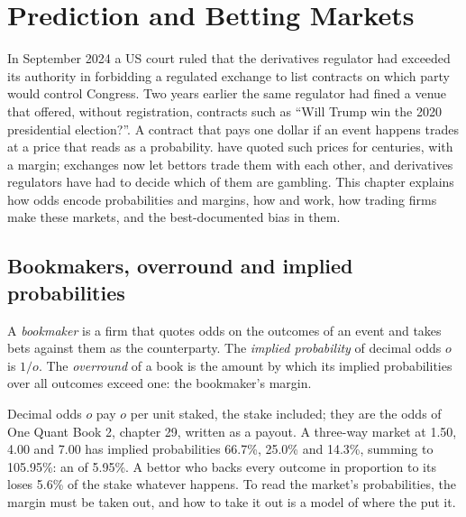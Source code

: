\chapter{Prediction and Betting Markets}\label{ch:m3:prediction-and-betting-markets}

In September 2024 a US court ruled that the derivatives regulator had exceeded its authority in
forbidding a regulated exchange to list contracts on which party would control Congress. Two years
earlier the same regulator had fined a  venue that offered, without registration, contracts
such as ``Will Trump win the 2020 presidential election?''. A contract that pays one dollar if an event happens trades at a price that reads as a
probability.  have quoted such prices for centuries, with a margin; exchanges now let bettors
trade them with each other, and derivatives regulators have had to decide which of them are gambling.
This chapter explains how odds encode probabilities and margins, how  and  work, how trading firms make these markets, and the best-documented bias in them.

\section{Bookmakers, overround and implied probabilities}

\begin{definition}\label{def:m3:prediction-and-betting-markets:book}
A \emph{bookmaker} is a firm that quotes odds on the outcomes of an event and takes bets against them as the
counterparty. The \emph{implied probability} of decimal odds $o$ is $1/o$. The \emph{overround}
of a book is the amount by which its implied probabilities over all outcomes exceed one: the bookmaker's margin.
\end{definition}

Decimal odds $o$ pay $o$ per unit staked, the stake included; they are the odds of One Quant Book 2, chapter 29, written as a
payout. A three-way market at 1.50, 4.00 and 7.00 has implied probabilities 66.7\%, 25.0\% and 14.3\%, summing to 105.95\%: an
 of 5.95\%. A bettor who backs every outcome in proportion to its  loses 5.6\% of the stake whatever
happens. To read the market's probabilities, the margin must be taken out, and how to take it out is a model of where the 
put it.

